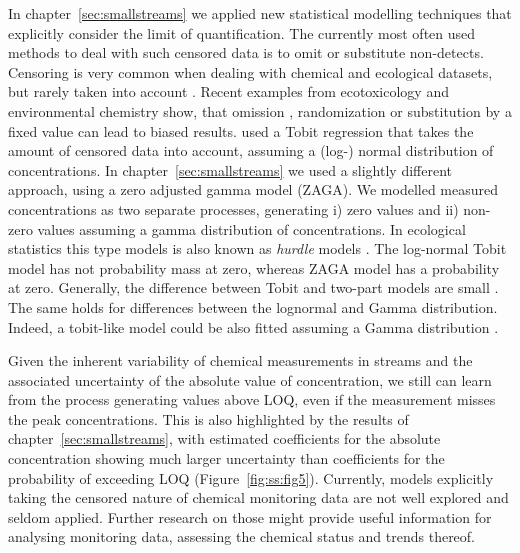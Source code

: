 In chapter~\ref{sec:smallstreams} we applied new statistical modelling techniques that explicitly consider the limit of quantification.
The currently most often used methods to deal with such censored data is to omit or substitute non-detects. 
Censoring is very common when dealing with chemical and ecological datasets, but rarely taken into account \citep{fox_ecological_2015}. 
Recent examples from ecotoxicology and environmental chemistry show, that omission \citep{hansen_re-evaluation_2015}, randomization \citep{goulson_neonicotinoids_2015} or substitution by a fixed value \citep{helsel_much_2010, helsel_fabricating_2006} can lead to biased results.
\citet{hansen_re-evaluation_2015} used a Tobit regression \citep{tobin_estimation_1958} that takes the amount of censored data into account, assuming a (log-) normal distribution of concentrations.
In chapter~\ref{sec:smallstreams} we used a slightly different approach, using a zero adjusted gamma model (ZAGA).
We modelled measured concentrations as two separate processes, generating i) zero values and ii) non-zero values assuming a gamma distribution of concentrations.
In ecological statistics this type models is also known as \emph{hurdle} models \citep{martin_zero_2005}. 
The log-normal Tobit model has not probability mass at zero, whereas ZAGA model has a probability at zero. 
Generally, the difference between Tobit and two-part models are small \citep{min_modeling_2002}. 
The same holds for differences between the lognormal and Gamma distribution. 
Indeed, a tobit-like model could be also fitted assuming a Gamma distribution \citep{sigrist_using_2010}.

Given the inherent variability of chemical measurements in streams \citep{wittmer_significance_2010} and the associated uncertainty of the absolute value of concentration, we still can learn from the process generating values above LOQ, even if the measurement misses the peak concentrations. 
This is also highlighted by the results of chapter~\ref{sec:smallstreams}, with estimated coefficients for the absolute concentration showing much larger uncertainty than coefficients for the probability of exceeding LOQ (Figure~\ref{fig:ss:fig5}). 
Currently, models explicitly taking the censored nature of chemical monitoring data are not well explored and seldom applied.
Further research on those might provide useful information for analysing monitoring data, assessing the chemical status and trends thereof.







